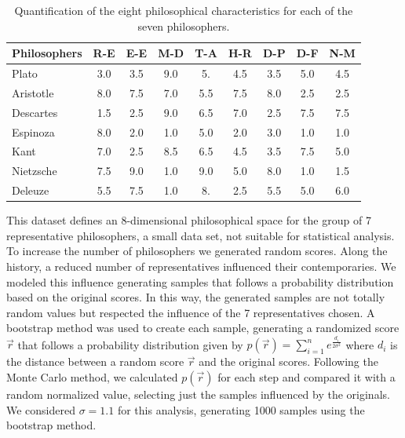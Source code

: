 \documentclass[%
 aip,
 jmp,%
 amsmath,amssymb,
 reprint,%
]{revtex4-1}
\begin{document}
\begin{table}%
\caption{\label{tab:tableA}Quantification of the
eight philosophical characteristics for each of the seven philosophers.  }

\begin{ruledtabular}
\begin{tabular}{|l||c|c|c|c|c|c|c|c|}

Philosophers & R-E & E-E & M-D & T-A & H-R & D-P & D-F & N-M \\ \hline

Plato  & 3.0 &   3.5 &   9.0  &   5.  &   4.5 &   3.5 &   5.0 &   4.5 \\

Aristotle & 8.0 &   7.5 &   7.0  &   5.5 &   7.5 &   8.0 &   2.5 &   2.5 \\

Descartes & 1.5 &   2.5 &   9.0  &   6.5 &   7.0 &   2.5 &   7.5 &   7.5 \\

Espinoza     & 8.0 &   2.0 &   1.0  &   5.0 &   2.0 &   3.0 &   1.0 &   1.0 \\

Kant      & 7.0 &   2.5 &   8.5  &   6.5 &   4.5 &   3.5 &   7.5 &   5.0 \\

Nietzsche & 7.5 &   9.0 &   1.0  &   9.0 &   5.0 &   8.0 &   1.0 &   1.5 \\

Deleuze   & 5.5 &   7.5 &   1.0  &   8.  &   2.5 &   5.5 &   5.0 &   6.0 \\
\end{tabular}
\end{ruledtabular}
\end{table}

This dataset defines an 8-dimensional philosophical space for the
group of 7 representative philosophers, a small data set, not suitable
for statistical analysis.
To increase the number of philosophers we generated
random scores. Along the history, a reduced
number of representatives influenced their contemporaries. We modeled
this influence generating samples that follows a probability
distribution based on the original scores. In this way, the generated
samples are not totally random values but respected the influence of the 7
representatives chosen.
A bootstrap method was used to create each sample, generating a
randomized score $\vec{r}$ that follows a probability distribution
given by $p(\vec{r}) = \sum^n_{i=1} e^{\frac{d_i}{2\sigma^2}}$ where
$d_i$ is the distance between a random score $\vec{r}$ and the
original scores.
Following the Monte Carlo method, we calculated $p(\vec{r})$ for each step
and compared it with a random normalized value, selecting just the
samples influenced by the originals. We considered $\sigma =
1.1$ for this analysis, generating 1000 samples using the bootstrap method.
\end{document}
